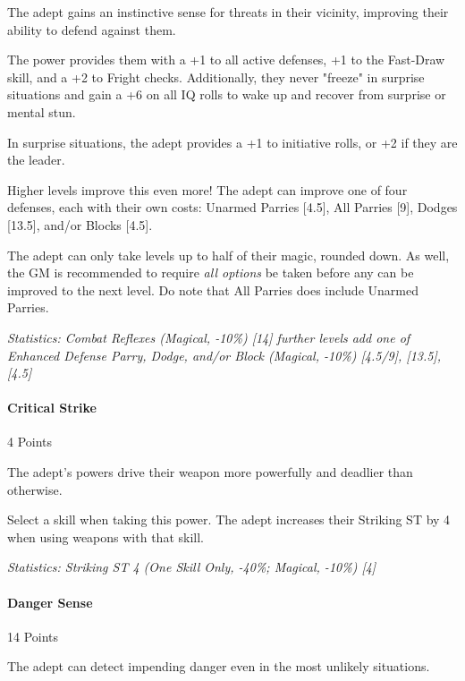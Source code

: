 \begin{multicols*}{3}
	The adept gains an instinctive sense for threats in their vicinity, improving their ability to defend against them. 
	
	The power provides them with a +1 to all active defenses, +1 to the Fast-Draw skill, and a +2 to Fright checks. Additionally, they never "freeze" in surprise situations and gain a +6 on all IQ rolls to wake up and recover from surprise or mental stun.
	
	In surprise situations, the adept provides a +1 to initiative rolls, or +2 if they are the leader.
	
	Higher levels improve this even more! The adept can improve one of four defenses, each with their own costs: Unarmed Parries [4.5], All Parries [9], Dodges [13.5], and/or Blocks [4.5]. 
	
	The adept can only take levels up to half of their magic, rounded down. As well, the GM is recommended to require \textit{all options} be taken before any can be improved to the next level. Do note that All Parries does include Unarmed Parries.

	\textcolor{OliveGreen}{\textit{Statistics: Combat Reflexes (Magical, -10\%) [14] further levels add one of Enhanced Defense Parry, Dodge, and/or Block (Magical, -10\%) [4.5/9], [13.5], [4.5]}} 
	
	\paragraph{Critical Strike}
	\begin{flushright}
		4 Points
	\end{flushright}
	
	The adept's powers drive their weapon more powerfully and deadlier than otherwise. 
	
	Select a skill when taking this power. The adept increases their Striking ST by 4 when using weapons with that skill.
	
	\textcolor{OliveGreen}{\textit{Statistics: Striking ST 4 (One Skill Only, -40\%; Magical, -10\%) [4] }}
	
	\paragraph{Danger Sense}
	\begin{flushright}
		14 Points
	\end{flushright}

	The adept can detect impending danger even in the most unlikely situations. 
	

\end{multicols*}
